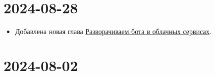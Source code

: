 \documentclass[
]{book}
\providecommand{\tightlist}{%
  \setlength{\itemsep}{0pt}\setlength{\parskip}{0pt}}
\begin{document}
\section*{2024-08-28}\label{section-1}

\begin{itemize}
\tightlist
\item
  Добавлена новая глава \hyperref[ux440ux430ux437ux432ux43eux440ux430ux447ux438ux432ux430ux435ux43c-ux431ux43eux442ux430-ux432-ux43eux431ux43bux430ux447ux43dux44bux445-ux441ux435ux440ux432ux438ux441ux430ux445]{Разворачиваем бота в облачных сервисах}.
\end{itemize}

\section*{2024-08-02}\label{section-2}
\end{document}
